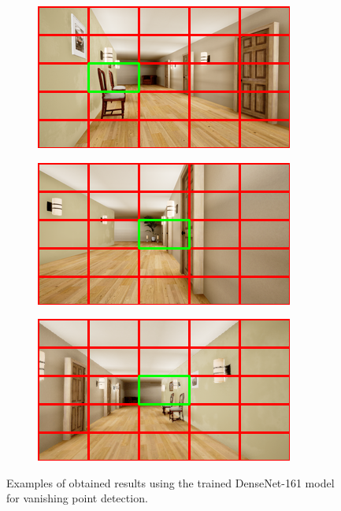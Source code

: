 \begin{figure}[H]
    \centering
    \begin{subfigure}{0.32\textwidth}
        \centering
        \includegraphics[width=\textwidth]{resources/png/06/vanishing-point/vpdeeplearning/results/0.png}
    \end{subfigure}
    \hfill
    \begin{subfigure}{0.32\textwidth}
        \centering
        \includegraphics[width=\textwidth]{resources/png/06/vanishing-point/vpdeeplearning/results/1.png}
    \end{subfigure}
    \hfill
    \begin{subfigure}{0.32\textwidth}
        \centering
        \includegraphics[width=\textwidth]{resources/png/06/vanishing-point/vpdeeplearning/results/2.png}
    \end{subfigure}
    \caption{Examples of obtained results using the trained DenseNet-161 model for vanishing point detection.}
    \label{fig:06.vpdeeplearning.results.examples}
\end{figure}

